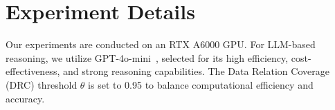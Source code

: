 \section{Experiment Details}
\label{expSet}
Our experiments are conducted on an RTX A6000 GPU. For LLM-based reasoning, we utilize GPT-4o-mini~\cite{openai}, selected for its high efficiency, cost-effectiveness, and strong reasoning capabilities. The Data Relation Coverage (DRC) threshold $\theta$ is set to 0.95 to balance computational efficiency and accuracy.




